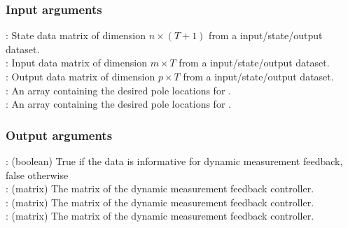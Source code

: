 \subsubsection*{Input arguments} 
\textbf{}: State data matrix of dimension $n \times (T+1)$ from a input/state/output dataset.\\
\textbf{}: Input data matrix of dimension $m \times T$ from a input/state/output dataset.\\
\textbf{}: Output data matrix of dimension $p \times T$ from a input/state/output dataset.\\
\textbf{}: An array containing the desired pole locations for .\\
\textbf{}: An array containing the desired pole locations for .

\subsubsection*{Output arguments} 
\textbf{}: (boolean) True if the data is informative for dynamic measurement feedback, false otherwise\\
\textbf{}: (matrix) The  matrix of the dynamic measurement feedback controller.\\
\textbf{}: (matrix) The  matrix of the dynamic measurement feedback controller.\\
\textbf{}: (matrix) The  matrix of the dynamic measurement feedback controller.

